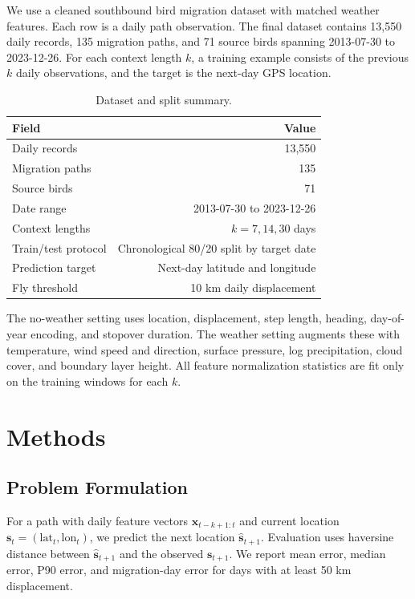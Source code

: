 \documentclass{article}
\begin{document}
We use a cleaned southbound bird migration dataset with matched weather features. Each row is a daily path observation. The final dataset contains 13,550 daily records, 135 migration paths, and 71 source birds spanning 2013-07-30 to 2023-12-26. For each context length $k$, a training example consists of the previous $k$ daily observations, and the target is the next-day GPS location.

\begin{table}[H]
\centering
\caption{Dataset and split summary.}
\label{tab:data_summary}
\begin{tabular}{lr}
\toprule
Field & Value \\
\midrule
Daily records & 13,550 \\
Migration paths & 135 \\
Source birds & 71 \\
Date range & 2013-07-30 to 2023-12-26 \\
Context lengths & $k = 7, 14, 30$ days \\
Train/test protocol & Chronological 80/20 split by target date \\
Prediction target & Next-day latitude and longitude \\
Fly threshold & 10 km daily displacement \\
\bottomrule
\end{tabular}
\end{table}

The no-weather setting uses location, displacement, step length, heading, day-of-year encoding, and stopover duration. The weather setting augments these with temperature, wind speed and direction, surface pressure, log precipitation, cloud cover, and boundary layer height. All feature normalization statistics are fit only on the training windows for each $k$.

\section{Methods}

\subsection{Problem Formulation}

For a path with daily feature vectors $\mathbf{x}_{t-k+1:t}$ and current location $\mathbf{s}_{t}=(\mathrm{lat}_{t}, \mathrm{lon}_{t})$, we predict the next location $\widehat{\mathbf{s}}_{t+1}$. Evaluation uses haversine distance between $\widehat{\mathbf{s}}_{t+1}$ and the observed $\mathbf{s}_{t+1}$. We report mean error, median error, P90 error, and migration-day error for days with at least 50 km displacement.
\end{document}
